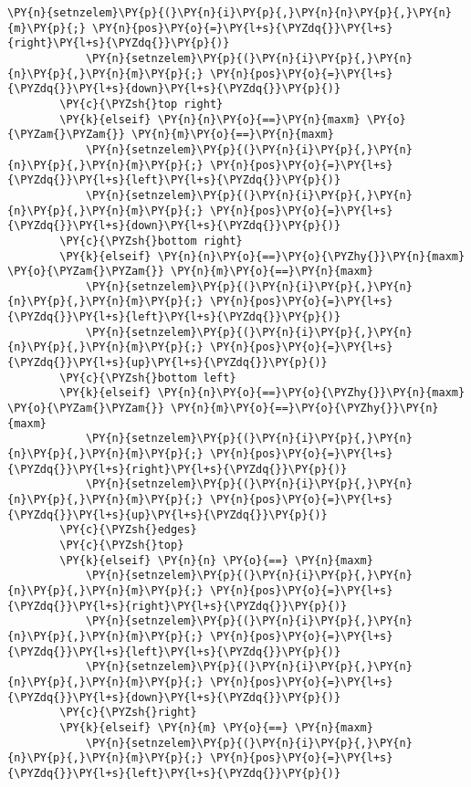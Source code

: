 \begin{Verbatim}[commandchars=\\\{\}]
            \PY{n}{setnzelem}\PY{p}{(}\PY{n}{i}\PY{p}{,}\PY{n}{n}\PY{p}{,}\PY{n}{m}\PY{p}{;} \PY{n}{pos}\PY{o}{=}\PY{l+s}{\PYZdq{}}\PY{l+s}{right}\PY{l+s}{\PYZdq{}}\PY{p}{)}
            \PY{n}{setnzelem}\PY{p}{(}\PY{n}{i}\PY{p}{,}\PY{n}{n}\PY{p}{,}\PY{n}{m}\PY{p}{;} \PY{n}{pos}\PY{o}{=}\PY{l+s}{\PYZdq{}}\PY{l+s}{down}\PY{l+s}{\PYZdq{}}\PY{p}{)}
        \PY{c}{\PYZsh{}top right}
        \PY{k}{elseif} \PY{n}{n}\PY{o}{==}\PY{n}{maxm} \PY{o}{\PYZam{}\PYZam{}} \PY{n}{m}\PY{o}{==}\PY{n}{maxm}
            \PY{n}{setnzelem}\PY{p}{(}\PY{n}{i}\PY{p}{,}\PY{n}{n}\PY{p}{,}\PY{n}{m}\PY{p}{;} \PY{n}{pos}\PY{o}{=}\PY{l+s}{\PYZdq{}}\PY{l+s}{left}\PY{l+s}{\PYZdq{}}\PY{p}{)}
            \PY{n}{setnzelem}\PY{p}{(}\PY{n}{i}\PY{p}{,}\PY{n}{n}\PY{p}{,}\PY{n}{m}\PY{p}{;} \PY{n}{pos}\PY{o}{=}\PY{l+s}{\PYZdq{}}\PY{l+s}{down}\PY{l+s}{\PYZdq{}}\PY{p}{)}
        \PY{c}{\PYZsh{}bottom right}
        \PY{k}{elseif} \PY{n}{n}\PY{o}{==}\PY{o}{\PYZhy{}}\PY{n}{maxm} \PY{o}{\PYZam{}\PYZam{}} \PY{n}{m}\PY{o}{==}\PY{n}{maxm}
            \PY{n}{setnzelem}\PY{p}{(}\PY{n}{i}\PY{p}{,}\PY{n}{n}\PY{p}{,}\PY{n}{m}\PY{p}{;} \PY{n}{pos}\PY{o}{=}\PY{l+s}{\PYZdq{}}\PY{l+s}{left}\PY{l+s}{\PYZdq{}}\PY{p}{)}
            \PY{n}{setnzelem}\PY{p}{(}\PY{n}{i}\PY{p}{,}\PY{n}{n}\PY{p}{,}\PY{n}{m}\PY{p}{;} \PY{n}{pos}\PY{o}{=}\PY{l+s}{\PYZdq{}}\PY{l+s}{up}\PY{l+s}{\PYZdq{}}\PY{p}{)}
        \PY{c}{\PYZsh{}bottom left}
        \PY{k}{elseif} \PY{n}{n}\PY{o}{==}\PY{o}{\PYZhy{}}\PY{n}{maxm} \PY{o}{\PYZam{}\PYZam{}} \PY{n}{m}\PY{o}{==}\PY{o}{\PYZhy{}}\PY{n}{maxm}
            \PY{n}{setnzelem}\PY{p}{(}\PY{n}{i}\PY{p}{,}\PY{n}{n}\PY{p}{,}\PY{n}{m}\PY{p}{;} \PY{n}{pos}\PY{o}{=}\PY{l+s}{\PYZdq{}}\PY{l+s}{right}\PY{l+s}{\PYZdq{}}\PY{p}{)}
            \PY{n}{setnzelem}\PY{p}{(}\PY{n}{i}\PY{p}{,}\PY{n}{n}\PY{p}{,}\PY{n}{m}\PY{p}{;} \PY{n}{pos}\PY{o}{=}\PY{l+s}{\PYZdq{}}\PY{l+s}{up}\PY{l+s}{\PYZdq{}}\PY{p}{)}
        \PY{c}{\PYZsh{}edges}
        \PY{c}{\PYZsh{}top}
        \PY{k}{elseif} \PY{n}{n} \PY{o}{==} \PY{n}{maxm}
            \PY{n}{setnzelem}\PY{p}{(}\PY{n}{i}\PY{p}{,}\PY{n}{n}\PY{p}{,}\PY{n}{m}\PY{p}{;} \PY{n}{pos}\PY{o}{=}\PY{l+s}{\PYZdq{}}\PY{l+s}{right}\PY{l+s}{\PYZdq{}}\PY{p}{)}
            \PY{n}{setnzelem}\PY{p}{(}\PY{n}{i}\PY{p}{,}\PY{n}{n}\PY{p}{,}\PY{n}{m}\PY{p}{;} \PY{n}{pos}\PY{o}{=}\PY{l+s}{\PYZdq{}}\PY{l+s}{left}\PY{l+s}{\PYZdq{}}\PY{p}{)}
            \PY{n}{setnzelem}\PY{p}{(}\PY{n}{i}\PY{p}{,}\PY{n}{n}\PY{p}{,}\PY{n}{m}\PY{p}{;} \PY{n}{pos}\PY{o}{=}\PY{l+s}{\PYZdq{}}\PY{l+s}{down}\PY{l+s}{\PYZdq{}}\PY{p}{)}
        \PY{c}{\PYZsh{}right}
        \PY{k}{elseif} \PY{n}{m} \PY{o}{==} \PY{n}{maxm}
            \PY{n}{setnzelem}\PY{p}{(}\PY{n}{i}\PY{p}{,}\PY{n}{n}\PY{p}{,}\PY{n}{m}\PY{p}{;} \PY{n}{pos}\PY{o}{=}\PY{l+s}{\PYZdq{}}\PY{l+s}{left}\PY{l+s}{\PYZdq{}}\PY{p}{)}

\end{Verbatim}
